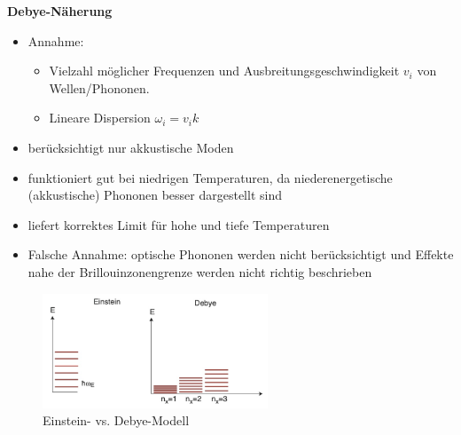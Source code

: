 \textbf{Debye-Näherung} 
\begin{itemize}
    \item Annahme: 
        \begin{itemize}
            \item Vielzahl möglicher Frequenzen und Ausbreitungsgeschwindigkeit $v_i$ von Wellen/Phononen. 
            \item Lineare Dispersion $\omega_i=v_ik$ 
        \end{itemize}
    \item berücksichtigt nur akkustische Moden
    \item funktioniert gut bei niedrigen Temperaturen, da niederenergetische (akkustische) Phononen besser dargestellt sind 
    \item liefert korrektes Limit für hohe und tiefe Temperaturen
    \item Falsche Annahme: optische Phononen werden nicht berücksichtigt und Effekte nahe der Brillouinzonengrenze werden nicht richtig beschrieben
\end{itemize}

\begin{figure}[H]
 \centering
 \includegraphics[width=0.6\textwidth]{resources/15-06-2015/Einstein_Debye.jpeg}
 \caption{Einstein- vs. Debye-Modell}
\end{figure}
\newpage